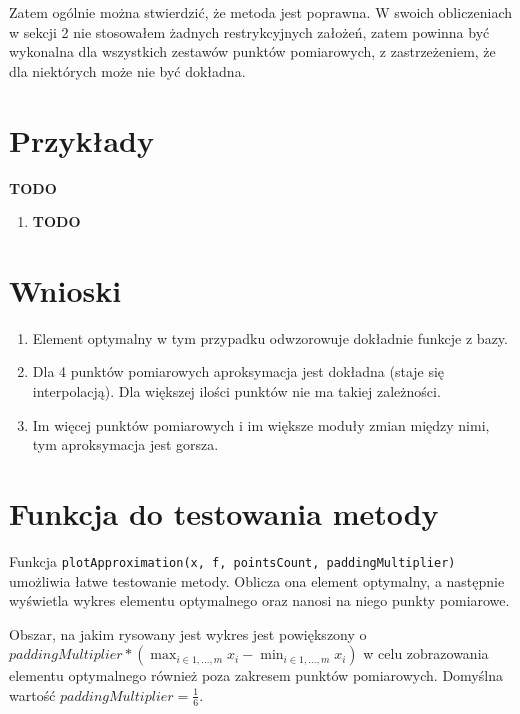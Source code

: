 \documentclass[12pt]{article}
\begin{document}
	Zatem ogólnie można stwierdzić, że metoda jest poprawna. W swoich obliczeniach w sekcji 2 nie stosowałem żadnych restrykcyjnych założeń, zatem powinna być wykonalna dla wszystkich zestawów punktów pomiarowych, z zastrzeżeniem, że dla niektórych może nie być dokładna.
	
	
	
	
	\section{Przykłady}
	\textbf{TODO}
	
	\begin{enumerate}[label=\textbf{Przykład \arabic*}]
		\item
		\textbf{TODO}
		
	\end{enumerate}
	
	
	
	
	
	
	\section{Wnioski}
	\begin{enumerate}
		\item Element optymalny w tym przypadku odwzorowuje dokładnie funkcje z bazy.
		\item Dla 4 punktów pomiarowych aproksymacja jest dokładna (staje się interpolacją). Dla większej ilości punktów nie ma takiej zależności.
		\item Im więcej punktów pomiarowych i im większe moduły zmian między nimi, tym aproksymacja jest gorsza.
	\end{enumerate}
	
	
	
	\section{Funkcja do testowania metody}
	Funkcja \texttt{plotApproximation(x, f, pointsCount, paddingMultiplier)} umożliwia łatwe testowanie metody. Oblicza ona element optymalny, a następnie wyświetla wykres elementu optymalnego oraz nanosi na niego punkty pomiarowe.
	
	Obszar, na jakim rysowany jest wykres jest powiększony o $paddingMultiplier * (\max_{i \in {1, \dots, m}} x_i - \min_{i \in {1, \dots, m}} x_i)$ w celu zobrazowania elementu optymalnego również poza zakresem punktów pomiarowych. Domyślna wartość $paddingMultiplier = \frac{1}{6}$.
	
\end{document}
